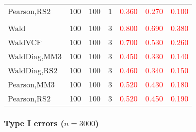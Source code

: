 \documentclass[
]{article}
\begin{document}
\begin{table}[H]
{\begin{tabular}[t]{lrrrrrr}
\hspace{1em}Pearson,RS2 & 100 & 100 & 1 & \textcolor{red}{0.360} & \textcolor{red}{0.270} & \textcolor{red}{0.100}\\
\addlinespace[0.3em]
\multicolumn{7}{l}{\textbf{3F 15V}}\\
\hspace{1em}Wald & 100 & 100 & 3 & \textcolor{red}{0.800} & \textcolor{red}{0.690} & \textcolor{red}{0.380}\\
\hspace{1em}WaldVCF & 100 & 100 & 3 & \textcolor{red}{0.700} & \textcolor{red}{0.530} & \textcolor{red}{0.260}\\
\hspace{1em}WaldDiag,MM3 & 100 & 100 & 3 & \textcolor{red}{0.450} & \textcolor{red}{0.330} & \textcolor{red}{0.140}\\
\hspace{1em}WaldDiag,RS2 & 100 & 100 & 3 & \textcolor{red}{0.460} & \textcolor{red}{0.340} & \textcolor{red}{0.150}\\
\hspace{1em}Pearson,MM3 & 100 & 100 & 3 & \textcolor{red}{0.520} & \textcolor{red}{0.430} & \textcolor{red}{0.180}\\
\hspace{1em}Pearson,RS2 & 100 & 100 & 3 & \textcolor{red}{0.520} & \textcolor{red}{0.450} & \textcolor{red}{0.190}\\
\bottomrule
\end{tabular}}
\endgroup{}
\end{table}

\hypertarget{type-i-errors-n3000-3}{%
\subsubsection{\texorpdfstring{Type I errors
(\(n=3000\))}{Type I errors (n=3000)}}\label{type-i-errors-n3000-3}}
\end{document}
